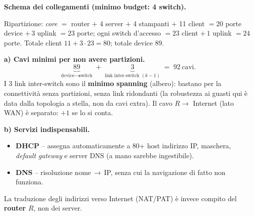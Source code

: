 \documentclass{report}
\begin{document}
\begin{solution}
\medskip
\noindent\textbf{Schema dei collegamenti (minimo budget: 4 switch).}
\begin{center}
\end{center}
Ripartizione: \emph{core} $=$ router $+$ 4 server $+$ 4 stampanti $+$ 11 client
$=20$ porte device $+\,3$ uplink $=23$ porte; ogni switch d'accesso $=23$ client
$+\,1$ uplink $=24$ porte. Totale client $11+3\cdot23 = 80$; totale device $89$.

\medskip
\noindent\textbf{a) Cavi minimi per non avere partizioni.}
\[
\underbrace{89}_{\text{device}\to\text{switch}} \;+\;
\underbrace{3}_{\text{link inter-switch }(k-1)} \;=\; \boxed{92\ \text{cavi}} .
\]
I 3 link inter-switch sono il \textbf{minimo spanning} (albero): bastano per la
connettività senza partizioni, senza link ridondanti (la robustezza ai guasti qui
è data dalla topologia a stella, non da cavi extra). Il cavo $R\to$ Internet (lato
WAN) è separato: $+1$ se lo si conta.

\medskip
\noindent\textbf{b) Servizi indispensabili.}
\begin{itemize}
\item \textbf{DHCP} -- assegna automaticamente a 80+ host indirizzo IP, maschera,
\emph{default gateway} e server DNS (a mano sarebbe ingestibile).
\item \textbf{DNS} -- risoluzione nome\,$\to$\,IP, senza cui la navigazione di
fatto non funziona.
\end{itemize}
La traduzione degli indirizzi verso Internet (NAT/PAT) è invece compito del
\textbf{router $R$}, non dei server.


\end{solution}
\end{document}
